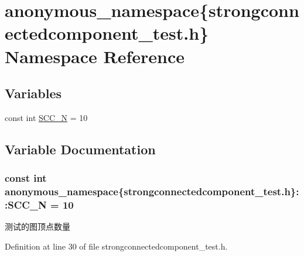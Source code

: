 \hypertarget{namespaceanonymous__namespace_02strongconnectedcomponent__test_8h_03}{}\section{anonymous\+\_\+namespace\{strongconnectedcomponent\+\_\+test.\+h\} Namespace Reference}
\label{namespaceanonymous__namespace_02strongconnectedcomponent__test_8h_03}
\subsection*{Variables}
\begin{DoxyCompactItemize}
\item 
const int \hyperlink{namespaceanonymous__namespace_02strongconnectedcomponent__test_8h_03_a16ade4f6cba9de3ca5ace5a83ba72457}{S\+C\+C\+\_\+\+N} = 10
\end{DoxyCompactItemize}


\subsection{Variable Documentation}
\hypertarget{namespaceanonymous__namespace_02strongconnectedcomponent__test_8h_03_a16ade4f6cba9de3ca5ace5a83ba72457}{}
\subsubsection[{S\+C\+C\+\_\+\+N}]{\setlength{\rightskip}{0pt plus 5cm}const int anonymous\+\_\+namespace\{strongconnectedcomponent\+\_\+test.\+h\}\+::S\+C\+C\+\_\+\+N = 10}\label{namespaceanonymous__namespace_02strongconnectedcomponent__test_8h_03_a16ade4f6cba9de3ca5ace5a83ba72457}
测试的图顶点数量 

Definition at line 30 of file strongconnectedcomponent\+\_\+test.\+h.

